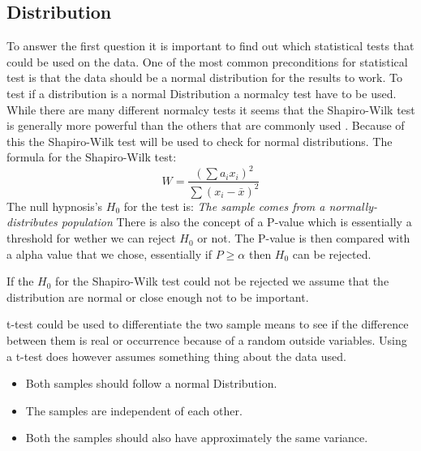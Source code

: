\subsection{Distribution}
To answer the first question it is important to find out which statistical tests that could be used on the data. One of the most common preconditions for statistical test is that the data should be a normal distribution for the results to work. To test if a distribution is a normal Distribution a normalcy test have to be used. While there are many different normalcy tests it seems that the Shapiro-Wilk test is generally more powerful than the others that are commonly used \cite{razali2011power}. Because of this the Shapiro-Wilk test will be used to check for normal distributions. The formula for the Shapiro-Wilk test:
$$W=\frac{( \sum{a_i x_i} )^2}{\sum{(x_i - \bar{x})^2}}$$
The null hypnosis's $H_0$ for the test is:
\textit{The sample comes from a normally-distributes population}
There is also the concept of a P-value which is essentially a threshold for wether we can reject $H_0$ or not. The P-value is then compared with a alpha value that we chose, essentially if $P \geq \alpha$ then $H_0$ can be rejected.

If the $H_0$ for the Shapiro-Wilk test could not be rejected we assume that the distribution are normal or close enough not to be important.

t-test could be used to differentiate the two sample means to see if the difference between them is real or occurrence because of a random outside variables. Using a t-test does however assumes something thing about the data used.
\begin{itemize}
    \item Both samples should follow a normal Distribution.
    \item The samples are independent of each other.
    \item Both the samples should also have approximately the same variance.
\end{itemize}